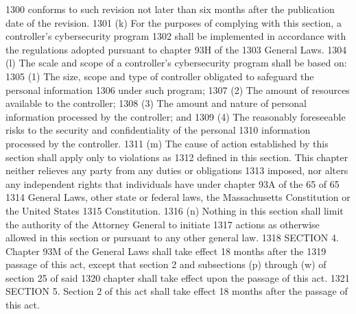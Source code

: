 1300 conforms to such revision not later than six months after the publication date of the revision.
1301 (k) For the purposes of complying with this section, a controller’s cybersecurity program
1302 shall be implemented in accordance with the regulations adopted pursuant to chapter 93H of the
1303 General Laws.
1304 (l) The scale and scope of a controller’s cybersecurity program shall be based on:
1305 (1) The size, scope and type of controller obligated to safeguard the personal information
1306 under such program;
1307 (2) The amount of resources available to the controller;
1308 (3) The amount and nature of personal information processed by the controller; and
1309 (4) The reasonably foreseeable risks to the security and confidentiality of the personal
1310 information processed by the controller.
1311 (m) The cause of action established by this section shall apply only to violations as
1312 defined in this section. This chapter neither relieves any party from any duties or obligations
1313 imposed, nor alters any independent rights that individuals have under chapter 93A of the
65 of 65
1314 General Laws, other state or federal laws, the Massachusetts Constitution or the United States
1315 Constitution.
1316 (n) Nothing in this section shall limit the authority of the Attorney General to initiate
1317 actions as otherwise allowed in this section or pursuant to any other general law.
1318 SECTION 4. Chapter 93M of the General Laws shall take effect 18 months after the
1319 passage of this act, except that section 2 and subsections (p) through (w) of section 25 of said
1320 chapter shall take effect upon the passage of this act.
1321 SECTION 5. Section 2 of this act shall take effect 18 months after the passage of this act.